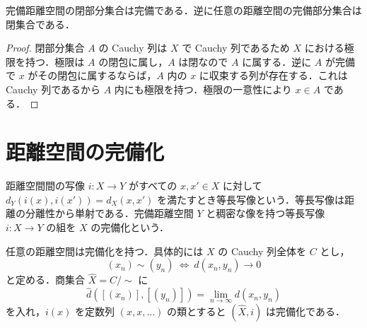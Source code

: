 \begin{prop}[閉部分空間と完備性]
完備距離空間の閉部分集合は完備である．逆に任意の距離空間の完備部分集合は閉集合である．
\end{prop}
\begin{proof}
閉部分集合 $A$ の Cauchy 列は $X$ で Cauchy 列であるため $X$ における極限を持つ．極限は $A$ の閉包に属し，$A$ は閉なので $A$ に属する．逆に $A$ が完備で $x$ がその閉包に属するならば，$A$ 内の $x$ に収束する列が存在する．これは Cauchy 列であるから $A$ 内にも極限を持つ．極限の一意性により $x\in A$ である．
\end{proof}
\section{距離空間の完備化}
\begin{defn}[等長写像と完備化]
距離空間間の写像 $i:X\to Y$ がすべての $x,x'\in X$ に対して $d_Y(i(x),i(x'))=d_X(x,x')$ を満たすとき等長写像という．等長写像は距離の分離性から単射である．完備距離空間 $Y$ と稠密な像を持つ等長写像 $i:X\to Y$ の組を $X$ の完備化という．
\end{defn}
\begin{prop}[Cauchy列による距離空間の完備化]
任意の距離空間は完備化を持つ．具体的には $X$ の Cauchy 列全体を $C$ とし，
\[
 (x_n)\sim(y_n)\ \Longleftrightarrow\ d(x_n,y_n)\to0
\]
と定める．商集合 $\widehat X=C/{\sim}$ に
\[
 \widehat d([(x_n)],[(y_n)])=\lim_{n\to\infty}d(x_n,y_n)
\]
を入れ，$i(x)$ を定数列 $(x,x,\ldots)$ の類とすると $(\widehat X,i)$ は完備化である．
\end{prop}
